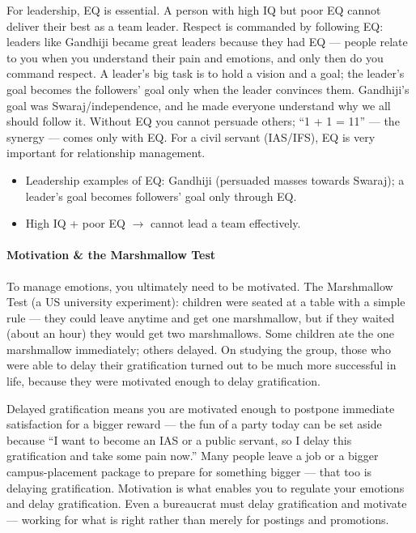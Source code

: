 For leadership, EQ is essential. A person with high IQ but poor EQ cannot deliver their best as a team leader. Respect is commanded by following EQ: leaders like Gandhiji became great leaders because they had EQ --- people relate to you when you understand their pain and emotions, and only then do you command respect. A leader's big task is to hold a vision and a goal; the leader's goal becomes the followers' goal only when the leader convinces them. Gandhiji's goal was Swaraj/independence, and he made everyone understand why we all should follow it. Without EQ you cannot persuade others; ``1 + 1 = 11'' --- the synergy --- comes only with EQ. For a civil servant (IAS/IFS), EQ is very important for relationship management.

\begin{ExampleBox}
\begin{itemize}
\item Leadership examples of EQ: Gandhiji (persuaded masses towards Swaraj); a leader's goal becomes followers' goal only through EQ.
\item High IQ + poor EQ $\rightarrow$ cannot lead a team effectively.
\end{itemize}
\end{ExampleBox}

\paragraph{Motivation \& the Marshmallow Test} To manage emotions, you ultimately need to be motivated. The Marshmallow Test (a US university experiment): children were seated at a table with a simple rule --- they could leave anytime and get one marshmallow, but if they waited (about an hour) they would get two marshmallows. Some children ate the one marshmallow immediately; others delayed. On studying the group, those who were able to delay their gratification turned out to be much more successful in life, because they were motivated enough to delay gratification.

Delayed gratification means you are motivated enough to postpone immediate satisfaction for a bigger reward --- the fun of a party today can be set aside because ``I want to become an IAS or a public servant, so I delay this gratification and take some pain now.'' Many people leave a job or a bigger campus-placement package to prepare for something bigger --- that too is delaying gratification. Motivation is what enables you to regulate your emotions and delay gratification. Even a bureaucrat must delay gratification and motivate --- working for what is right rather than merely for postings and promotions.


